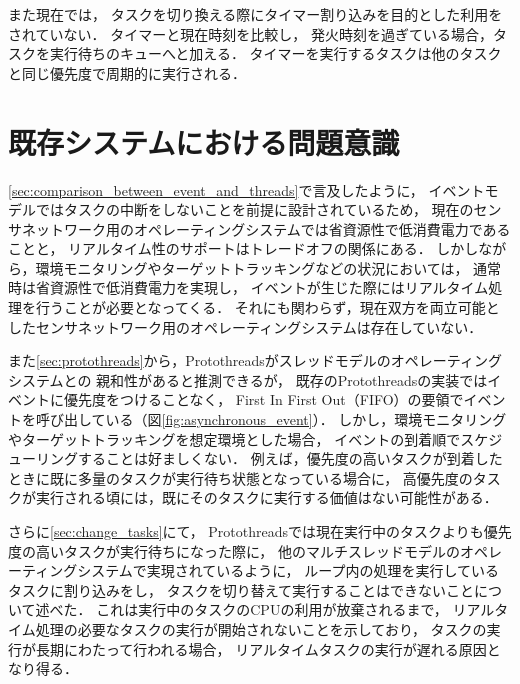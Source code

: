 また現在では，
タスクを切り換える際にタイマー割り込みを目的とした利用をされていない．
タイマーと現在時刻を比較し，
発火時刻を過ぎている場合，タスクを実行待ちのキューへと加える．
タイマーを実行するタスクは他のタスクと同じ優先度で周期的に実行される．




\section{既存システムにおける問題意識}\label{sec:problems}
\ref{sec:comparison_between_event_and_threads}で言及したように，
イベントモデルではタスクの中断をしないことを前提に設計されているため，
現在のセンサネットワーク用のオペレーティングシステムでは省資源性で低消費電力であることと，
リアルタイム性のサポートはトレードオフの関係にある．
しかしながら，環境モニタリングやターゲットトラッキングなどの状況においては，
通常時は省資源性で低消費電力を実現し，
イベントが生じた際にはリアルタイム処理を行うことが必要となってくる．
それにも関わらず，現在双方を両立可能としたセンサネットワーク用のオペレーティングシステムは存在していない．

また\ref{sec:protothreads}から，Protothreadsがスレッドモデルのオペレーティングシステムとの
親和性があると推測できるが，
既存のProtothreadsの実装ではイベントに優先度をつけることなく，
First In First Out（FIFO）の要領でイベントを呼び出している（図\ref{fig:asynchronous_event}）．
しかし，環境モニタリングやターゲットトラッキングを想定環境とした場合，
イベントの到着順でスケジューリングすることは好ましくない．
例えば，優先度の高いタスクが到着したときに既に多量のタスクが実行待ち状態となっている場合に，
高優先度のタスクが実行される頃には，既にそのタスクに実行する価値はない可能性がある．



さらに\ref{sec:change_tasks}にて，
Protothreadsでは現在実行中のタスクよりも優先度の高いタスクが実行待ちになった際に，
他のマルチスレッドモデルのオペレーティングシステムで実現されているように，
ループ内の処理を実行しているタスクに割り込みをし，
タスクを切り替えて実行することはできないことについて述べた．
これは実行中のタスクのCPUの利用が放棄されるまで，
リアルタイム処理の必要なタスクの実行が開始されないことを示しており，
タスクの実行が長期にわたって行われる場合，
リアルタイムタスクの実行が遅れる原因となり得る．




